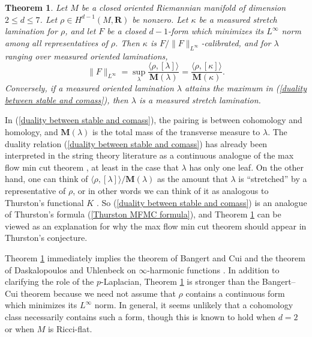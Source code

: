 \documentclass[reqno,11pt]{amsart}
\newcommand{\RR}{\mathbf{R}}
\newcommand{\Mass}{\mathbf M}
\newtheorem{mainthm}{Theorem}
\theoremstyle{definition}
\numberwithin{equation}{section}
\begin{document}
\begin{mainthm}\label{lams are calibrated}
Let $M$ be a closed oriented Riemannian manifold of dimension $2 \leq d \leq 7$.
Let $\rho \in H^{d - 1}(M, \RR)$ be nonzero.
Let $\kappa$ be a measured stretch lamination for $\rho$, and let $F$ be a closed $d - 1$-form which minimizes its $L^\infty$ norm among all representatives of $\rho$.
Then $\kappa$ is $F/\|F\|_{L^\infty}$-calibrated, and for $\lambda$ ranging over measured oriented laminations,
\begin{equation}\label{duality between stable and comass}
\|F\|_{L^\infty} = \sup_\lambda \frac{\langle \rho, [\lambda]\rangle}{\Mass(\lambda)} = \frac{\langle \rho, [\kappa]\rangle}{\Mass(\kappa)}.
\end{equation}
Conversely, if a measured oriented lamination $\lambda$ attains the maximum in (\ref{duality between stable and comass}), then $\lambda$ is a measured stretch lamination.
\end{mainthm}

In (\ref{duality between stable and comass}), the pairing is between cohomology and homology, and $\Mass(\lambda)$ is the total mass of the transverse measure to $\lambda$.
The duality relation (\ref{duality between stable and comass}) has already been interpreted in the string theory literature as a continuous analogue of the max flow min cut theorem \cite{Freedman_2016}, at least in the case that $\lambda$ has only one leaf.
On the other hand, one can think of $\langle \rho, [\lambda]\rangle/\Mass(\lambda)$ as the amount that $\lambda$ is ``stretched'' by a representative of $\rho$, or in other words we can think of it as analogous to Thurston's functional $K$ \cite[\S5.3]{daskalopoulos2020transverse}.
So (\ref{duality between stable and comass}) is an analogue of Thurston's formula (\ref{Thurston MFMC formula}), and Theorem \ref{lams are calibrated} can be viewed as an explanation for why the max flow min cut theorem should appear in Thurston's conjecture.

Theorem \ref{lams are calibrated} immediately implies the theorem of Bangert and Cui \cite{bangert_cui_2017} and the theorem of Daskalopoulos and Uhlenbeck on $\infty$-harmonic functions \cite{daskalopoulos2020transverse}.
In addition to clarifying the role of the $p$-Laplacian, Theorem \ref{lams are calibrated} is stronger than the Bangert--Cui theorem because we need not assume that $\rho$ contains a continuous form which minimizes its $L^\infty$ norm.
In general, it seems unlikely that a cohomology class necessarily contains such a form, though this is known to hold when $d = 2$ \cite{Evans08} or when $M$ is Ricci-flat. 
\end{document}
